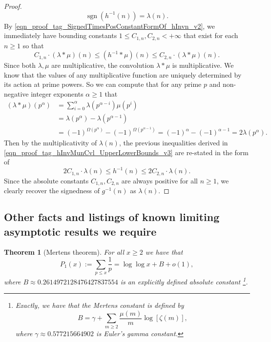 \documentclass[11pt,reqno,a4letter]{article}
\numberwithin{figure}{section}
\numberwithin{table}{section}
\theoremstyle{plain}
\newtheorem{theorem}{Theorem}
\numberwithin{theorem}{section}
\theoremstyle{definition}
\begin{document}
\begin{proof}
\begin{equation} 
\label{eqn_proof_tag_SignedTimesPosConstantFormOf_hInvn_v2}
\operatorname{sgn}(h^{-1}(n)) = \lambda(n). 
\end{equation}
By \eqref{eqn_proof_tag_SignedTimesPosConstantFormOf_hInvn_v2}, we immediately have bounding constants 
$1 \leq C_{1,n}, C_{2,n} < +\infty$ that exist for each $n \geq 1$ so that 
\begin{equation} 
\label{eqn_proof_tag_hInvMunCvl_UpperLowerBounds_v3} 
C_{1,n} \cdot (\lambda \ast \mu)(n) \leq (h^{-1} \ast \mu)(n) \leq C_{2,n} \cdot (\lambda \ast \mu)(n). 
\end{equation} 
Since both $\lambda,\mu$ are multiplicative, the convolution $\lambda \ast \mu$ is multiplicative. 
We know that the values of 
any multiplicative function are uniquely determined by its action at prime powers. 
So we can compute that for any prime $p$ and non-negative integer exponents $\alpha \geq 1$ that 
\begin{align*} 
(\lambda \ast \mu)(p^{\alpha}) & = \sum_{i=0}^{\alpha} \lambda(p^{\alpha-i}) \mu(p^{i}) \\ 
     & = \lambda(p^{\alpha}) - \lambda(p^{\alpha-1}) \\ 
     & = 
     (-1)^{\Omega(p^{\alpha})} - (-1)^{\Omega(p^{\alpha-1})} = 
     (-1)^{\alpha} - (-1)^{\alpha-1} = 
     2 \lambda(p^{\alpha}). 
\end{align*} 
Then by the multiplicativity of $\lambda(n)$, the previous inequalities derived in 
\eqref{eqn_proof_tag_hInvMunCvl_UpperLowerBounds_v3} are re-stated in the form of 
\[
2 C_{1,n} \cdot \lambda(n) \leq h^{-1}(n) \leq 2 C_{2,n} \cdot \lambda(n). 
\] 
Since the absolute constants $C_{1,n}, C_{2,n}$ are always positive for all $n \geq 1$, 
we clearly recover the signedness of $g^{-1}(n)$ as $\lambda(n)$. 
\end{proof} 

\subsection{Other facts and listings of known limiting asymptotic results we require} 
\label{subSection_OtherFactsAndResults} 

\begin{theorem}[Mertens theorem]
\label{theorem_Mertens_theorem} 
For all $x \geq 2$ we have that 
\[
P_1(x) := \sum_{p \leq x} \frac{1}{p} = \log\log x + B + o(1), 
\]
where 
$B \approx 0.2614972128476427837554$ 
is an explicitly defined absolute constant \footnote{ 
     Exactly, we have that the \emph{Mertens constant} is defined by 
     \[
     B = \gamma + \sum_{m \geq 2} \frac{\mu(m)}{m} \log\left[\zeta(m)\right], 
     \]
     where $\gamma \approx 0.577215664902$ is Euler's gamma constant. 
}.
\end{theorem} 
\end{document}
